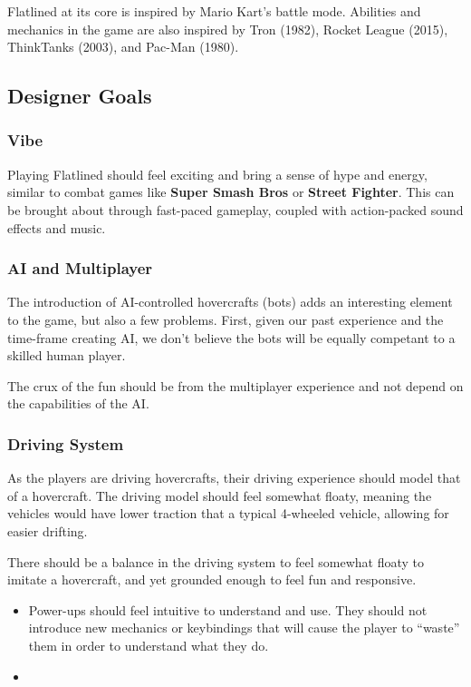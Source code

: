 \documentclass{article}
\newcommand{\name}{Flatlined}
\theoremstyle{definition}
\begin{document}
\name{} at its core is inspired by Mario Kart's battle mode. Abilities and
mechanics in the game are also inspired by Tron (1982), Rocket League (2015),
ThinkTanks (2003), and Pac-Man (1980).

\subsection{Designer Goals}

\subsubsection{Vibe}

Playing \name{} should feel exciting and bring a sense of hype and energy,
similar to combat games like \textbf{Super Smash Bros} or \textbf{Street
Fighter}. This can be brought about through fast-paced gameplay, coupled with
action-packed sound effects and music.

\subsubsection{AI and Multiplayer}

The introduction of AI-controlled hovercrafts (bots) adds an interesting
element to the game, but also a few problems. First, given our past experience
and the time-frame creating AI, we don't believe the bots will be equally
competant to a skilled human player.

The crux of the fun should be from the multiplayer experience and not depend on
the capabilities of the AI.\@

\subsubsection{Driving System}

As the players are driving hovercrafts, their driving experience should model
that of a hovercraft. The driving model should feel somewhat floaty, meaning
the vehicles would have lower traction that a typical 4-wheeled vehicle,
allowing for easier drifting.

There should be a balance in the driving system to feel somewhat floaty to
imitate a hovercraft, and yet grounded enough to feel fun and responsive.

\begin{itemize}
  \item Power-ups should feel intuitive to understand and use. They should not
    introduce new mechanics or keybindings that will cause the player to
    ``waste'' them in order to understand what they do.
  \item 
\end{itemize}
\end{document}
